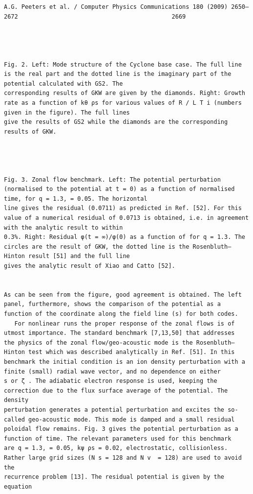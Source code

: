\documentclass[a4paper]{article}
\newcommand{\gkwpagefont}{\fontsize{6.0pt}{7.55pt}\selectfont}
\begin{document}
\begin{Verbatim}[fontsize=\gkwpagefont]
                                                   A.G. Peeters et al. / Computer Physics Communications 180 (2009) 2650–2672                                            2669




Fig. 2. Left: Mode structure of the Cyclone base case. The full line is the real part and the dotted line is the imaginary part of the potential calculated with GS2. The
corresponding results of GKW are given by the diamonds. Right: Growth rate as a function of kθ ρs for various values of R / L T i (numbers given in the figure). The full lines
give the results of GS2 while the diamonds are the corresponding results of GKW.




Fig. 3. Zonal flow benchmark. Left: The potential perturbation (normalised to the potential at t = 0) as a function of normalised time, for q = 1.3, = 0.05. The horizontal
line gives the residual (0.0711) as predicted in Ref. [52]. For this value of a numerical residual of 0.0713 is obtained, i.e. in agreement with the analytic result to within
0.3%. Right: Residual φ(t = ∞)/φ(0) as a function of for q = 1.3. The circles are the result of GKW, the dotted line is the Rosenbluth–Hinton result [51] and the full line
gives the analytic result of Xiao and Catto [52].


As can be seen from the figure, good agreement is obtained. The left panel, furthermore, shows the comparison of the potential as a
function of the coordinate along the field line (s) for both codes.
   For nonlinear runs the proper response of the zonal flows is of utmost importance. The standard benchmark [7,13,50] that addresses
the physics of the zonal flow/geo-acoustic mode is the Rosenbluth–Hinton test which was described analytically in Ref. [51]. In this
benchmark the initial condition is an ion density perturbation with a finite (small) radial wave vector, and no dependence on either
s or ζ . The adiabatic electron response is used, keeping the correction due to the flux surface average of the potential. The density
perturbation generates a potential perturbation and excites the so-called geo-acoustic mode. This mode is damped and a small residual
poloidal flow remains. Fig. 3 gives the potential perturbation as a function of time. The relevant parameters used for this benchmark
are q = 1.3, = 0.05, kψ ρs = 0.02, electrostatic, collisionless. Rather large grid sizes (N s = 128 and N v  = 128) are used to avoid the
recurrence problem [13]. The residual potential is given by the equation


\end{Verbatim}
\end{document}
